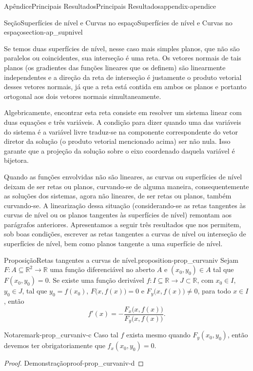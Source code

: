 \documentclass[oneside,10pt,]{book}
\numberwithin{equation}{section}
\newcommand{\R}{\mathbb R}
\begin{document}
\begin{appendixptx}{Apêndice}{Principais Resultados}{}{Principais Resultados}{}{}{appendix-apendice}
\begin{sectionptx}{Seção}{Superfícies de nível e Curvas no espaço}{}{Superfícies de nível e Curvas no espaço}{}{}{section-ap_supnivel}
\par
Se temos duas superfícies de nível, nesse caso mais simples planos, que não são paralelos ou coincidentes, sua interseção é uma reta. Os vetores normais de tais planos (os gradientes das funções lineares que os definem) são linearmente independentes e a direção da reta de interseção é justamente o produto vetorial desses vetores normais, já que a reta está contida em ambos os planos e portanto ortogonal aos dois vetores normais simultaneamente.%
\par
Algebricamente, encontrar esta reta consiste em resolver um sistema linear com duas equações e três variáveis. A condição para dizer quando uma das variáveis do sistema é a variável livre traduz-se na componente correspondente do vetor diretor da solução (o produto vetorial mencionado acima) ser não nula. Isso garante que a projeção da solução sobre o eixo coordenado daquela variável é bijetora.%
\par
Quando as funções envolvidas não são lineares, as curvas ou superfícies de nível deixam de ser retas ou planos, curvando-se de alguma maneira, consequentemente as soluções dos sistemas, agora não lineares, de ser retas ou planos, também curvando-se. A linearização dessa situação (considerando-se as retas tangentes às curvas de nível ou os planos tangentes às superfícies de nível) remontam aos parágrafos anteriores. Apresentamos a seguir três resultados que nos permitem, sob boas condições, escrever as retas tangentes a curvas de nível ou interseção de superfícies de nível, bem como planos tangente a uma superfície de nível.%
\begin{proposition}{Proposição}{Retas tangentes a curvas de nível.}{}{proposition-prop_curvaniv}%
Sejam \(F\colon A\subseteq\R^2\to\R\) uma função diferenciável no aberto \(A\) e \((x_0,y_0)\in A\) tal que \(F(x_0,y_0)=0\). Se existe uma função derivável \(f\colon
I\subseteq\R\to J\subset\R\), com \(x_0\in I\), \(y_0\in
J\), tal que \(y_0=f(x_0)\), \(F\big(x,f(x)\big)=0\) e \(F_y\big(x,f(x)\big)\neq 0\), para todo \(x\in I\), então%
\begin{equation*}
f'(x)=-\dfrac{F_x\big(x,f(x))}{F_y\big(x,f(x)\big)}.
\end{equation*}
\begin{remark}{Nota}{}{remark-prop_curvaniv-c}%
Caso tal \(f\) exista mesmo quando \(F_y(x_0,y_0)\), então devemos ter obrigatoriamente que \(f_x(x_0,y_0)=0\).\end{remark}
\end{proposition}
\begin{proof}{Demonstração}{}{proof-prop_curvaniv-d}

\end{proof}
\end{sectionptx}
\end{appendixptx}
\end{document}
